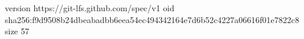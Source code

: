 version https://git-lfs.github.com/spec/v1
oid sha256:f9d9508b24dbeabadbb6eea54ec494342164e7d6b52c4227a06616f01e7822c8
size 57
